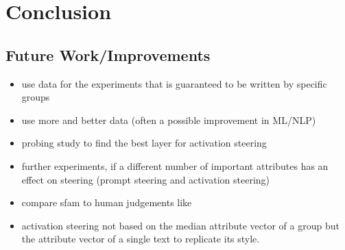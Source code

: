 \chapter{Conclusion}
\label{sec:conclusion}

\section{Future Work/Improvements} %
\begin{itemize}
  \item use data for the experiments that is guaranteed to be written by specific groups
  \item use more and better data (often a possible improvement in ML/NLP)
  \item probing study to find the best layer for activation steering
  \item further experiments, if a different number of important attributes has an effect on steering (prompt steering and activation steering)
  \item compare \ac{sfam} to human judgements like \citet{patelLearningInterpretableStyle2023}
  \item activation steering not based on the median attribute vector of a group but the attribute vector of a single text to replicate its style.
\end{itemize}
